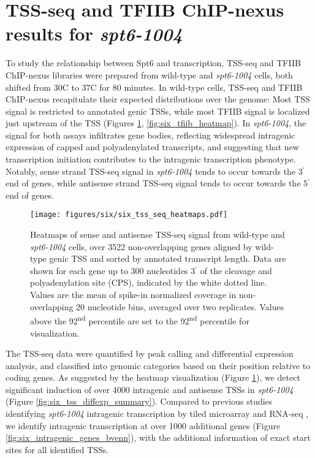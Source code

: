\section{TSS-seq and TFIIB ChIP-nexus results for \textit{spt6-1004}}
\label{sec:six_tss_tfiib}

To study the relationship between Spt6 and transcription, TSS-seq and TFIIB ChIP-nexus libraries were prepared from wild-type and \textit{spt6-1004} cells, both shifted from 30\textdegree C to 37\textdegree C for 80 minutes.
In wild-type cells, TSS-seq and TFIIB ChIP-nexus recapitulate their expected distributions over the genome: Most TSS signal is restricted to annotated genic TSSs, while most TFIIB signal is localized just upstream of the TSS (Figures \ref{fig:six_tss_seq_heatmaps}, \ref{fig:six_tfiib_heatmap}).
In \textit{spt6-1004}, the signal for both assays infiltrates gene bodies, reflecting widespread intragenic expression of capped and polyadenylated transcripts, and suggesting that new transcription initiation contributes to the intragenic transcription phenotype.
Notably, sense strand TSS-seq signal in \textit{spt6-1004} tends to occur towards the 3$^\prime$ end of genes, while antisense strand TSS-seq signal tends to occur towards the 5$^\prime$ end of genes.

\begin{figure}[H]
\centering
\texttt{[image: figures/six/six\_tss\_seq\_heatmaps.pdf]}
\caption[Heatmaps of sense and antisense TSS-seq signal from wild-type and \textit{spt6-1004} cells, over non-overlapping coding genes.]{Heatmaps of sense and antisense TSS-seq signal from wild-type and \textit{spt6-1004} cells, over 3522 non-overlapping genes aligned by wild-type genic TSS and sorted by annotated transcript length. Data are shown for each gene up to 300 nucleotides 3$^\prime$ of the cleavage and polyadenylation site (CPS), indicated by the white dotted line. Values are the mean of spike-in normalized coverage in non-overlapping 20 nucleotide bins, averaged over two replicates. Values above the 92\textsuperscript{nd} percentile are set to the 92\textsuperscript{nd} percentile for visualization.}
\label{fig:six_tss_seq_heatmaps}
\end{figure}

The TSS-seq data were quantified by peak calling and differential expression analysis, and classified into genomic categories based on their position relative to coding genes.
As suggested by the heatmap visualization (Figure \ref{fig:six_tss_seq_heatmaps}), we detect significant induction of over 4000 intragenic and antisense TSSs in \textit{spt6-1004} (Figure \ref{fig:six_tss_diffexp_summary}).
Compared to previous studies identifying \textit{spt6-1004} intragenic transcription by tiled microarray and RNA-seq \citep{cheung2008, uwimana2017}, we identify intragenic transcription at over 1000 additional genes (Figure \ref{fig:six_intragenic_genes_bvenn}), with the additional information of exact start sites for all identified TSSs.

